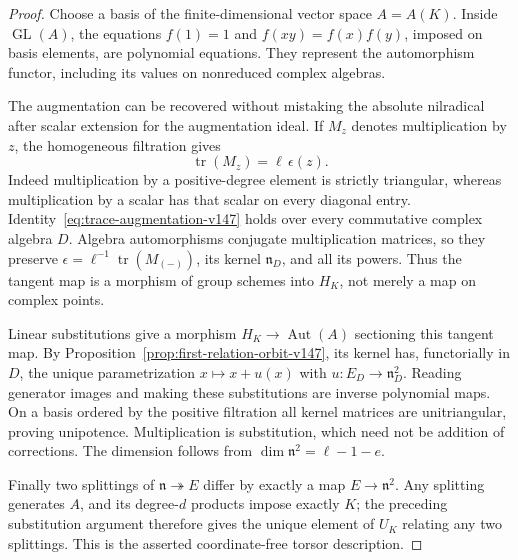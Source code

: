 \documentclass[11pt,reqno]{amsart}
\numberwithin{equation}{section}
\theoremstyle{definition}\newtheorem{definition}[theorem]{Definition}
\theoremstyle{remark}\newtheorem{remark}[theorem]{Remark}
\begin{document}
\begin{proof}
Choose a basis of the finite-dimensional vector space \(A=A(K)\).
Inside \(\operatorname{GL}(A)\), the equations
\(f(1)=1\) and \(f(xy)=f(x)f(y)\), imposed on basis elements,
are polynomial equations.  They represent the automorphism functor,
including its values on nonreduced complex algebras.

The augmentation can be recovered without mistaking the absolute
nilradical after scalar extension for the augmentation ideal.  If
\(M_z\) denotes multiplication by \(z\), the homogeneous filtration
gives
\begin{equation}\label{eq:trace-augmentation-v147}
                      \operatorname{tr}(M_z)=\ell\,\epsilon(z).
\end{equation}
Indeed multiplication by a positive-degree element is strictly
triangular, whereas multiplication by a scalar has that scalar on
every diagonal entry.  Identity~\eqref{eq:trace-augmentation-v147}
holds over every commutative complex algebra \(D\).  Algebra
automorphisms conjugate multiplication matrices, so they preserve
\(\epsilon=\ell^{-1}\operatorname{tr}(M_{(-)})\), its kernel
\(\mathfrak n_D\), and all its powers.  Thus the tangent map is
a morphism of group schemes into \(H_K\), not merely a map on
complex points.

Linear substitutions give a morphism \(H_K\to\operatorname{Aut}(A)\)
sectioning this tangent map.  By Proposition~\ref{prop:first-relation-orbit-v147},
its kernel has, functorially in \(D\), the unique parametrization
\(x\mapsto x+u(x)\) with \(u:E_D\to\mathfrak n_D^2\).
Reading generator images and making these substitutions are inverse
polynomial maps.  On a basis ordered by the positive filtration all
kernel matrices are unitriangular, proving unipotence.  Multiplication
is substitution, which need not be addition of corrections.  The
dimension follows from \(\dim\mathfrak n^2=\ell-1-e\).

Finally two splittings of \(\mathfrak n\twoheadrightarrow E\)
differ by exactly a map \(E\to\mathfrak n^2\).  Any splitting
generates \(A\), and its degree-\(d\) products impose exactly
\(K\); the preceding substitution argument therefore gives the
unique element of \(U_K\) relating any two splittings.  This is
the asserted coordinate-free torsor description.
\end{proof}
\end{document}
